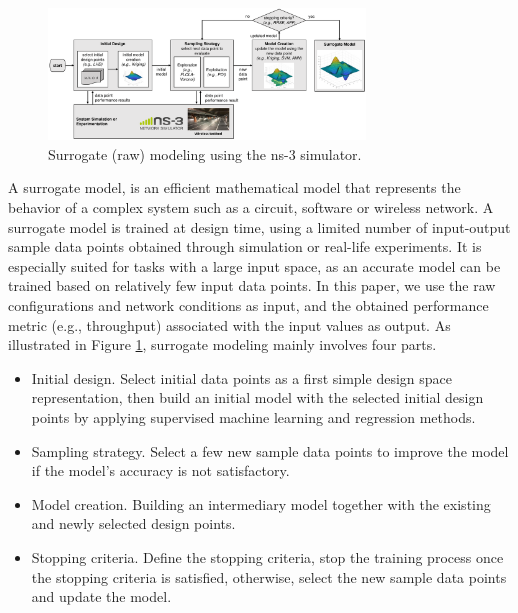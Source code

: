 \begin{figure}[t]
  \centering
  \includegraphics[width=0.75\textwidth]{figures/surrogate_modeling_approach}
  \caption{Surrogate (\gls{raw}) modeling using the ns-3 simulator. \label{fig:sumo-ns3}}
\end{figure}

 A surrogate model, is an efficient mathematical model that represents the behavior of a complex system such as a circuit, software or wireless network. A surrogate model is trained at design time, using a limited number of input-output sample data points obtained through simulation or real-life experiments. It is especially suited for tasks with a large input space, as an accurate model can be trained based on relatively few input data points. In this paper, we use the \gls{raw} configurations and network conditions as input, and the obtained performance metric (e.g., throughput) 
associated with the input values as output.
As illustrated in Figure \ref{fig:sumo-ns3},  surrogate modeling mainly involves four parts.
 \begin{itemize}
 \item  Initial design. Select initial data points as a first simple design space representation, then build an initial model with the selected initial design points by applying supervised machine learning and regression methods. 
 \item  Sampling strategy. Select a few new sample data points to improve the model if the model's accuracy is not satisfactory.  \item  Model creation. Building an intermediary model together with the existing and newly selected design points. 
 \item  Stopping criteria. Define the stopping criteria, stop the training process once the stopping criteria is satisfied, otherwise, select the new sample data points and update the model. 
 \end{itemize}
  
